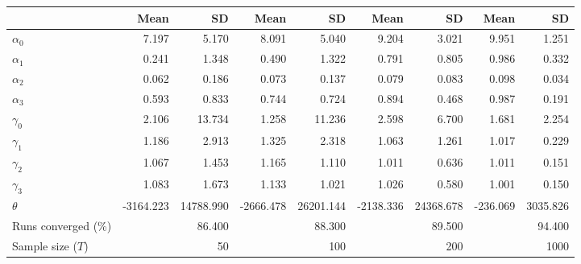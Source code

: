 
\begin{tabular}[t]{lrrrrrrrr}
\toprule
  & Mean & SD & Mean  & SD  & Mean   & SD   & Mean    & SD   \\
\midrule
$\alpha_{0}$ & 7.197 & 5.170 & 8.091 & 5.040 & 9.204 & 3.021 & 9.951 & 1.251\\
$\alpha_{1}$ & 0.241 & 1.348 & 0.490 & 1.322 & 0.791 & 0.805 & 0.986 & 0.332\\
$\alpha_{2}$ & 0.062 & 0.186 & 0.073 & 0.137 & 0.079 & 0.083 & 0.098 & 0.034\\
$\alpha_{3}$ & 0.593 & 0.833 & 0.744 & 0.724 & 0.894 & 0.468 & 0.987 & 0.191\\
$\gamma_{0}$ & 2.106 & 13.734 & 1.258 & 11.236 & 2.598 & 6.700 & 1.681 & 2.254\\
$\gamma_{1}$ & 1.186 & 2.913 & 1.325 & 2.318 & 1.063 & 1.261 & 1.017 & 0.229\\
$\gamma_{2}$ & 1.067 & 1.453 & 1.165 & 1.110 & 1.011 & 0.636 & 1.011 & 0.151\\
$\gamma_{3}$ & 1.083 & 1.673 & 1.133 & 1.021 & 1.026 & 0.580 & 1.001 & 0.150\\
$\theta$ & -3164.223 & 14788.990 & -2666.478 & 26201.144 & -2138.336 & 24368.678 & -236.069 & 3035.826\\
Runs converged (\%) &  & 86.400 &  & 88.300 &  & 89.500 &  & 94.400\\
Sample size ($T$) &  & 50 &  & 100 &  & 200 &  & 1000\\
\bottomrule
\end{tabular}

